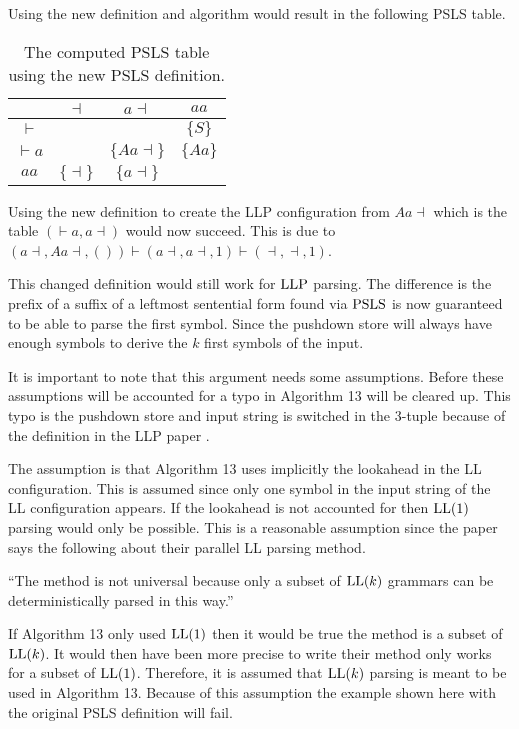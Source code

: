 \noindent Using the new definition and algorithm would result in the following PSLS table.
\begin{table}[H]
    \centering
    \begin{tabular}{c|c|c|c}
        & $\dashv$ & $a\dashv$ & $aa$ \\ \hline
        $\vdash$ & & & $\{S\}$ \\\hline
        $\vdash a$ & & $\{Aa\dashv\}$ & $\{Aa\}$ \\\hline
        $aa$ & $\{\dashv\}$ & $\{a\dashv\}$ & 
    \end{tabular}
    \caption{The computed PSLS table using the new PSLS definition.}
\end{table}
\noindent Using the new definition to create the LLP configuration from $Aa\dashv$ which is the table $(\vdash a,a \dashv)$ would now succeed. This is due to $(a \dashv, Aa\dashv, ()) \vdash (a \dashv, a\dashv, 1) \vdash ( \dashv, \dashv, 1)$.

This changed definition would still work for $\text{LLP}$ parsing. The difference is the prefix of a suffix of a leftmost sentential form found via $\text{PSLS}$ is now guaranteed to be able to parse the first symbol. Since the pushdown store will always have enough symbols to derive the $k$ first symbols of the input.

It is important to note that this argument needs some assumptions. Before these assumptions will be accounted for a typo in Algorithm 13 \cite[15]{Vagner2007} will be cleared up. This typo is the pushdown store and input string is switched in the 3-tuple because of the definition in the LLP paper \cite[5]{Vagner2007}.

The assumption is that Algorithm 13 uses implicitly the lookahead in the LL configuration. This is assumed since only one symbol in the input string of the LL configuration appears. If the lookahead is not accounted for then $\text{LL}(1)$ parsing would only be possible. This is a reasonable assumption since the paper says the following about their parallel LL parsing method.
\begin{center}
    ``The method is not universal because only a subset of $\text{LL}(k)$ grammars can be deterministically parsed in this way.'' \cite[2]{Vagner2007}
\end{center}
If Algorithm 13 only used $\text{LL}(1)$ then it would be true the method is a subset of $\text{LL}(k)$. It would then have been more precise to write their method only works for a subset of $\text{LL}(1)$. Therefore, it is assumed that $\text{LL}(k)$ parsing is meant to be used in Algorithm 13. Because of this assumption the example shown here with the original PSLS definition will fail.

